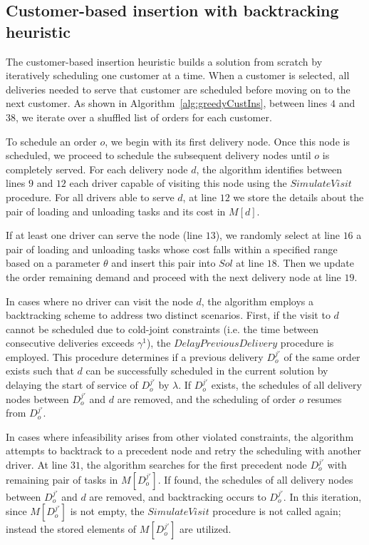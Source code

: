 \documentclass{article}
\begin{document}
\subsection{Customer-based insertion with backtracking heuristic}

The customer-based insertion heuristic builds a solution from scratch by iteratively scheduling one customer at a time. When a customer is selected, all deliveries needed to serve that customer are scheduled before moving on to the next customer. As shown in Algorithm~\ref{alg:greedyCustIns}, between lines $4$ and $38$, we iterate over a shuffled list of orders for each customer.

To schedule an order $o$, we begin with its first delivery node. Once this node is scheduled, we proceed to schedule the subsequent delivery nodes until $o$ is completely served. For each delivery node $d$, the algorithm identifies between lines $9$ and $12$ each driver capable of visiting this node using the $SimulateVisit$ procedure. For all drivers able to serve $d$, at line $12$ we store the details about the pair of loading and unloading tasks and its cost in $M[d]$.

If at least one driver can serve the node (line $13$), we randomly select at line $16$  a pair of loading and unloading tasks whose cost falls within a specified range based on a parameter $\theta$ and insert this pair into $Sol$ at line $18$. Then we update the order remaining demand and proceed with the next delivery node at line $19$. 

In cases where no driver can visit the node $d$, the algorithm employs a backtracking scheme to address two distinct scenarios. First, if the visit to $d$ cannot be scheduled due to cold-joint constraints (i.e. the time between consecutive deliveries exceeds $\gamma^1$), the $DelayPreviousDelivery$ procedure is employed. This procedure determines if a previous delivery $D^{j'}_o$ of the same order exists such that $d$ can be successfully scheduled in the current solution by delaying the start of service of $D^{j'}_o$ by $\lambda$. If $D^{j'}_o$ exists, the schedules of all delivery nodes between $D^{j'}_o$ and $d$ are removed, and the scheduling of order $o$ resumes from $D^{j'}_o$. 

In cases where infeasibility arises from other violated constraints, the algorithm attempts to backtrack to a precedent node and retry the scheduling with another driver. At line $31$, the algorithm searches for the first precedent node $D^{j'}_o$ with remaining pair of tasks in $M[D^{j'}_o]$. If found, the schedules of all delivery nodes between $D^{j'}_o$ and $d$ are removed, and backtracking occurs to $D^{j'}_o$. In this iteration, since $M[D^{j'}_o]$ is not empty, the $SimulateVisit$ procedure is not called again; instead the stored elements of $M[D^{j'}_o]$ are utilized.
\end{document}
